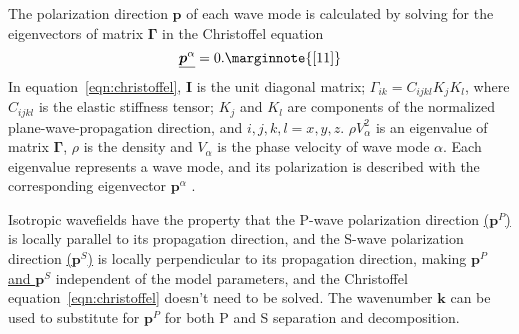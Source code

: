 \documentclass[manuscript,ulem,graphix,revised]{geophysics}
\begin{document}
The polarization direction \marginnote{[11]}\uline{$\boldsymbol{p}$} of each wave mode is calculated by solving for the eigenvectors of matrix $\boldsymbol{\Gamma}$ in the Christoffel equation \citep{aki80, tsvankin05}
\begin{equation}
[\boldsymbol{\Gamma}-\rho V_\alpha^2\boldsymbol{I}]\uline{\boldsymbol{p}^\alpha}=0. \marginnote{[11]}
\label{eqn:christoffel}
\end{equation}
In equation~\ref{eqn:christoffel}, $\boldsymbol{I}$ is the unit diagonal matrix; $\Gamma_{ik}=C_{ijkl}K_jK_l$, where $C_{ijkl}$ is the elastic stiffness tensor; $K_j$ and $K_l$ are components of the normalized plane-wave-propagation direction, and $i,j,k,l = x,y,z$. $\rho V_\alpha^2$ is an eigenvalue of matrix $\boldsymbol{\Gamma}$, $\rho$ is the density and $V_\alpha$ is the phase velocity of wave mode $\alpha$. Each eigenvalue represents a wave mode, and its polarization is described with the corresponding eigenvector \uline{$\boldsymbol{p}^\alpha$} \marginnote{[11]}.

Isotropic wavefields have the property that the P-wave polarization direction \marginnote{[11]} \uline{($\boldsymbol{p}^P$)} is locally parallel to its propagation direction, and the S-wave polarization direction \marginnote{[11]}\uline{($\boldsymbol{p}^S$)} is locally perpendicular to its propagation direction, making \marginnote{[11]}\uline{$\boldsymbol{p}^P$ and $\boldsymbol{p}^S$} independent of the model parameters, and the Christoffel equation~\ref{eqn:christoffel} doesn't need to be solved. The wavenumber \marginnote{[11]} \uline{$\boldsymbol{k}$} can be used to substitute for \marginnote{[11]}\uline{$\boldsymbol{p}^P$} for both P and S separation and decomposition.
\end{document}
